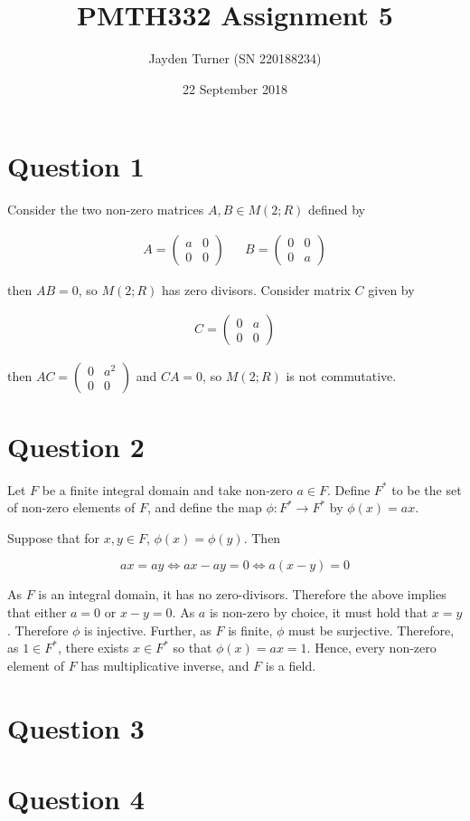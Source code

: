 \documentclass{article}
\title{PMTH332 Assignment 5}
\date{22 September 2018}
\author{Jayden Turner (SN 220188234)}
\begin{document}
\maketitle
{}

\section*{Question 1}

Consider the two non-zero matrices $A, B \in M(2; R)$ defined by

\begin{align*}
    A = \begin{pmatrix}
        a & 0\\
        0 & 0
    \end{pmatrix}
    &&
    B = \begin{pmatrix}
        0 & 0\\
        0 & a
    \end{pmatrix}
\end{align*}

then $AB = 0$, so $M(2; R)$ has zero divisors. Consider matrix $C$ given by

\begin{align*}
    C = \begin{pmatrix}
        0 & a\\
        0 & 0
    \end{pmatrix}
\end{align*}

then $AC = \begin{pmatrix}0 & a^2\\0 & 0\end{pmatrix}$ and $CA = 0$,
so $M(2; R)$ is not commutative.

\section*{Question 2}

Let $F$ be a finite integral domain and take non-zero $a \in F$. Define $F^*$
to be the set of non-zero elements of $F$, and define the map $\phi: F^* \to F^*$
by $\phi(x) = ax$.

\hfill\break
Suppose that for $x, y \in F$, $\phi(x) = \phi(y)$. Then

\begin{equation*}
    ax = ay \iff ax - ay = 0 \iff a(x - y) = 0
\end{equation*}

As $F$ is an integral domain, it has no zero-divisors. Therefore the above
implies that either $a = 0$ or $x - y = 0$. As $a$ is non-zero by choice,
it must hold that $x = y$. Therefore $\phi$ is injective. Further, as $F$
is finite, $\phi$ must be surjective. Therefore, as $1 \in F^*$, there
exists $x \in F^*$ so that $\phi(x) = ax = 1$. Hence, every non-zero element
of $F$ has multiplicative inverse, and $F$ is a field.

\section*{Question 3}

\section*{Question 4}
\end{document}
